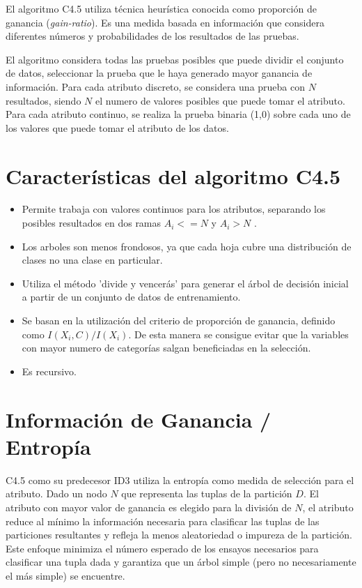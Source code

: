 El algoritmo C4.5 utiliza técnica heurística conocida como proporción de ganancia (\emph{gain-ratio}). Es una medida basada en información que considera diferentes números y probabilidades de los resultados de las pruebas. 

El algoritmo considera todas las pruebas posibles que puede dividir el conjunto de datos, seleccionar la prueba que le haya generado mayor ganancia de información. Para cada atributo discreto, se considera una prueba con $N$ resultados, siendo $N$ el numero de valores posibles que puede tomar el atributo. Para cada atributo continuo, se realiza la prueba binaria (1,0) sobre cada uno de los valores que puede tomar el atributo de los datos.

\section{Características del algoritmo C4.5}
\begin{itemize}
	\item Permite trabaja con valores continuos para los atributos, separando los posibles resultados en dos ramas $ A_{i} <= N $ y $ A_{i} > N $ . 
	\item Los arboles son menos frondosos, ya que cada hoja cubre una distribución de clases no una clase en particular.
	\item Utiliza el método 'divide y vencerás' para generar el árbol de decisión inicial a partir de un conjunto de datos de entrenamiento.
	\item Se basan en la utilización del criterio de proporción de ganancia, definido como $ I(X_{i},C) / I(X_{i})  $. De esta manera se consigue evitar que la variables con mayor numero de categorías salgan beneficiadas en la selección. 
	\item Es recursivo.
\end{itemize}

\section{Información de Ganancia / Entropía }
C4.5 como su predecesor ID3 utiliza la entropía como medida de selección para el atributo. 
Dado un nodo $N$ que representa las tuplas de la partición $D$. El atributo con mayor valor de ganancia es elegido para la división de $N$, el atributo reduce al mínimo la información necesaria para clasificar las tuplas de las particiones resultantes y refleja la menos aleatoriedad o impureza de la partición. Este enfoque minimiza el número esperado de los ensayos necesarios para clasificar una tupla dada y garantiza que un árbol simple (pero no necesariamente el más simple) se encuentre.

